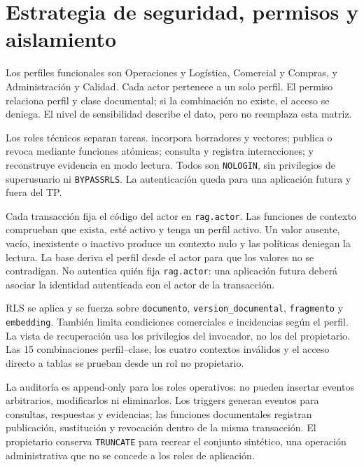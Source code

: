 \section{Estrategia de seguridad, permisos y aislamiento}

Los perfiles funcionales son Operaciones y Logística, Comercial y Compras, y
Administración y Calidad. Cada actor pertenece a un solo perfil. El permiso relaciona
perfil y clase documental; si la combinación no existe, el acceso se deniega.
El nivel de sensibilidad describe el dato, pero no reemplaza esta matriz.

Los roles técnicos separan tareas.  incorpora borradores y
vectores;  publica o revoca mediante funciones atómicas;
 consulta y registra interacciones; y 
reconstruye evidencia en modo lectura. Todos son
\texttt{NOLOGIN}, sin privilegios de superusuario ni \texttt{BYPASSRLS}. La
autenticación queda para una aplicación futura y fuera del TP.

Cada transacción fija el código del actor en \texttt{rag.actor}. Las funciones
de contexto comprueban que exista, esté activo y tenga un perfil activo. Un
valor ausente, vacío, inexistente o inactivo produce un contexto nulo y las
políticas deniegan la lectura. La base deriva el perfil desde el actor para que
los valores no se contradigan. No autentica quién fija \texttt{rag.actor}: una
aplicación futura deberá asociar la identidad autenticada con el actor de la
transacción.

RLS se aplica y se fuerza sobre \texttt{documento},
\texttt{version\_documental}, \texttt{fragmento} y \texttt{embedding}. También
limita condiciones comerciales e incidencias según el perfil. La vista de
recuperación usa los privilegios del invocador, no los del propietario. Las 15
combinaciones perfil--clase, los cuatro contextos inválidos y el acceso directo
a tablas se prueban desde un rol no propietario.

La auditoría es append-only para los roles operativos: no pueden insertar
eventos arbitrarios, modificarlos ni eliminarlos. Los triggers generan eventos
para consultas, respuestas y evidencias; las funciones documentales registran
publicación, sustitución y revocación dentro de la misma transacción. El
propietario conserva \texttt{TRUNCATE} para recrear el conjunto sintético, una
operación administrativa que no se concede a los roles de aplicación.
